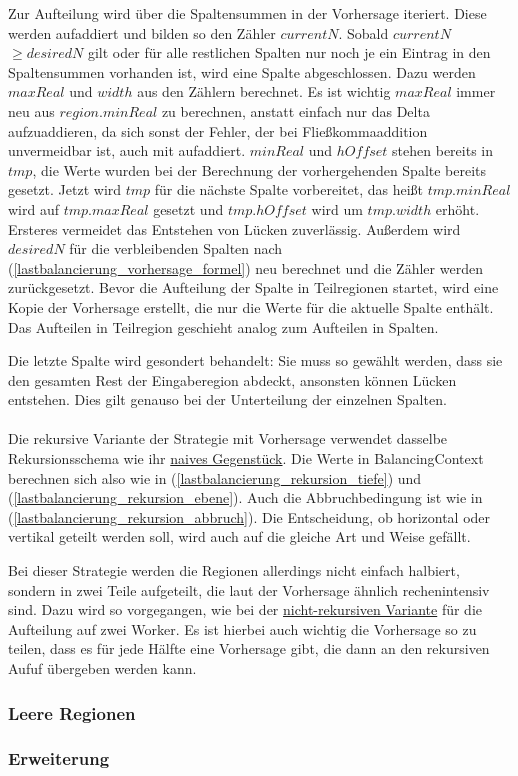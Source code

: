 Zur Aufteilung wird über die Spaltensummen in der Vorhersage iteriert. Diese werden aufaddiert und bilden so den Zähler $currentN$.
Sobald $currentN$ $\geq desiredN$ gilt oder für alle restlichen Spalten nur noch je ein Eintrag in den Spaltensummen vorhanden ist, wird eine Spalte abgeschlossen.
Dazu werden $maxReal$ und $width$ aus den Zählern berechnet. Es ist wichtig $maxReal$ immer neu aus $region.minReal$ zu berechnen, anstatt einfach nur das Delta aufzuaddieren, da sich sonst der Fehler, der bei Fließkommaaddition unvermeidbar ist, auch mit aufaddiert. $minReal$ und $hOffset$ stehen bereits in $tmp$, die Werte wurden bei der Berechnung der vorhergehenden Spalte bereits gesetzt.
Jetzt wird $tmp$ für die nächste Spalte vorbereitet, das heißt $tmp.minReal$ wird auf $tmp.maxReal$ gesetzt und $tmp.hOffset$ wird um $tmp.width$ erhöht. Ersteres vermeidet das Entstehen von Lücken zuverlässig.
Außerdem wird $desiredN$ für die verbleibenden Spalten nach (\ref{lastbalancierung_vorhersage_formel}) neu berechnet und die Zähler werden zurückgesetzt.
Bevor die Aufteilung der Spalte in Teilregionen startet, wird eine Kopie der Vorhersage erstellt, die nur die Werte für die aktuelle Spalte enthält.
Das Aufteilen in Teilregion geschieht analog zum Aufteilen in Spalten.

Die letzte Spalte wird gesondert behandelt: Sie muss so gewählt werden, dass sie den gesamten Rest der Eingaberegion abdeckt, ansonsten können Lücken entstehen.
Dies gilt genauso bei der Unterteilung der einzelnen Spalten.

\paragraph*{}
Die rekursive Variante der Strategie mit Vorhersage verwendet dasselbe Rekursionsschema wie ihr \hyperref[lastbalancierung_naiv_rekursion]{naives Gegenstück}.
Die Werte in BalancingContext berechnen sich also wie in (\ref{lastbalancierung_rekursion_tiefe}) und (\ref{lastbalancierung_rekursion_ebene}).
Auch die Abbruchbedingung ist wie in (\ref{lastbalancierung_rekursion_abbruch}). Die Entscheidung, ob horizontal oder vertikal geteilt werden soll, wird auch auf die gleiche Art und Weise gefällt.

Bei dieser Strategie werden die Regionen allerdings nicht einfach halbiert, sondern in zwei Teile aufgeteilt, die laut der Vorhersage ähnlich rechenintensiv sind.
Dazu wird so vorgegangen, wie bei der \hyperref[lastbalancierung_vorhersage]{nicht-rekursiven Variante} für die Aufteilung auf zwei Worker.
Es ist hierbei auch wichtig die Vorhersage so zu teilen, dass es für jede Hälfte eine Vorhersage gibt, die dann an den rekursiven Aufuf übergeben werden kann.

\subsubsection{Leere Regionen} \label{lastbalancierung_leereregion}

\subsubsection{Erweiterung} \label{lastbalancierung_erweiterung}